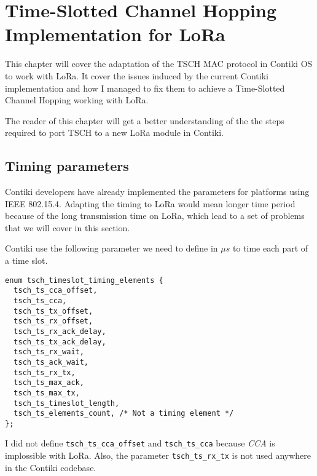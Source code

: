 \chapter{Time-Slotted Channel Hopping Implementation for LoRa\label{section:tsch}}

This chapter will cover the adaptation of the TSCH MAC protocol in Contiki OS to
work with LoRa.
It cover the issues induced by the current Contiki implementation and how I
managed to fix them to achieve a Time-Slotted Channel Hopping working with LoRa.

The reader of this chapter will get a better understanding of the the steps
required to port TSCH to a new LoRa module in Contiki.

\section{Timing parameters\label{section:timingparameters}}

Contiki developers have already implemented the parameters for
platforms using IEEE 802.15.4.
Adapting the timing to LoRa would mean longer time period because of the long
transmission time on LoRa, which lead to a set of problems that we will cover in this
section.

Contiki use the following parameter we need to define in $\mu s$ to time each
part of a time slot.


\begin{lstlisting}
enum tsch_timeslot_timing_elements {
  tsch_ts_cca_offset,
  tsch_ts_cca,
  tsch_ts_tx_offset,
  tsch_ts_rx_offset,
  tsch_ts_rx_ack_delay,
  tsch_ts_tx_ack_delay,
  tsch_ts_rx_wait,
  tsch_ts_ack_wait,
  tsch_ts_rx_tx,
  tsch_ts_max_ack,
  tsch_ts_max_tx,
  tsch_ts_timeslot_length,
  tsch_ts_elements_count, /* Not a timing element */
};
\end{lstlisting}

I did not define \lstinline{tsch_ts_cca_offset} and \lstinline{tsch_ts_cca} 
because \emph{CCA} is implossible with LoRa.
Also, the parameter \lstinline{tsch_ts_rx_tx} is not used anywhere in the 
Contiki codebase.

